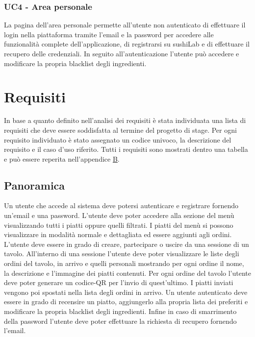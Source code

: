 \subsubsection{UC4 - Area personale}
La pagina dell'area personale permette all'utente non autenticato di effettuare il login nella piattaforma tramite l'email e la password per accedere alle funzionalità complete dell'applicazione, di registrarsi su sushiLab e di effettuare il recupero delle credenziali. In seguito all'autenticazione l'utente può accedere e modificare la propria blacklist degli ingredienti.
\section{Requisiti}
In base a quanto definito nell'analisi dei requisiti è stata individuata una lista di requisiti che deve essere soddisfatta al termine del progetto di stage. Per ogni requisito individuato è stato assegnato un codice univoco, la descrizione del requisito e il caso d'uso riferito. Tutti i requisiti sono mostrati dentro una tabella e può essere reperita nell'appendice {\hyperref[cap:appendice b]{B}}.
\subsection{Panoramica}
Un utente che accede al sistema deve potersi autenticare e registrare fornendo un'email e una password.
L'utente deve poter accedere alla sezione del menù visualizzando tutti i piatti oppure quelli filtrati. I piatti del menù si possono visualizzare in modalità normale e dettagliata ed essere aggiunti agli ordini. L'utente deve essere in grado di creare, partecipare o uscire da una sessione di un tavolo. All'interno di una sessione l'utente deve poter visualizzare le liste degli ordini del tavolo, in arrivo e quelli personali mostrando per ogni ordine il nome, la descrizione e l'immagine dei piatti contenuti. Per ogni ordine del tavolo l'utente deve poter generare un codice-QR per l'invio di quest'ultimo. I piatti inviati vengono poi spostati nella lista degli ordini in arrivo. Un utente autenticato deve essere in grado di recensire un piatto, aggiungerlo alla propria lista dei preferiti e modificare la propria blacklist degli ingredienti. Infine in caso di smarrimento della password l'utente deve poter effettuare la richiesta di recupero fornendo l'email.